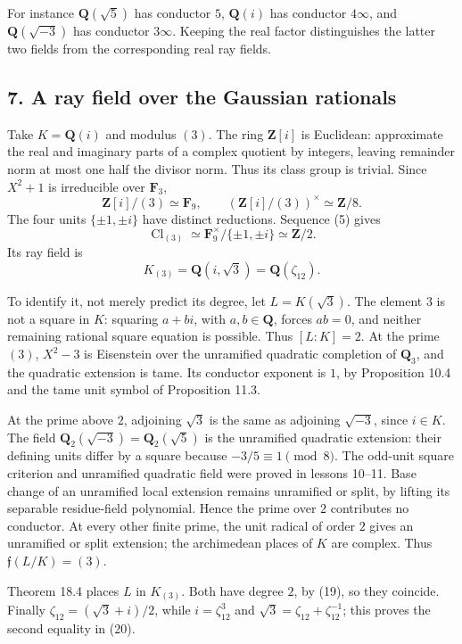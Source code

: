 \documentclass[11pt,a4paper]{article}
\begin{document}
For instance \(\mathbf Q(\sqrt5)\) has conductor \(5\), \(\mathbf Q(i)\)
has conductor \(4\infty\), and \(\mathbf Q(\sqrt{-3})\) has conductor
\(3\infty\). Keeping the real factor distinguishes the latter two fields
from the corresponding real ray fields.

\subsection{7. A ray field over the Gaussian
rationals}\label{a-ray-field-over-the-gaussian-rationals}

Take \(K=\mathbf Q(i)\) and modulus \((3)\). The ring \(\mathbf Z[i]\)
is Euclidean: approximate the real and imaginary parts of a complex
quotient by integers, leaving remainder norm at most one half the
divisor norm. Thus its class group is trivial. Since \(X^2+1\) is
irreducible over \(\mathbf F_3\), \[
\mathbf Z[i]/(3)\simeq\mathbf F_9,
\qquad (\mathbf Z[i]/(3))^\times\simeq\mathbf Z/8.
\] The four units \(\{\pm1,\pm i\}\) have distinct reductions. Sequence
(5) gives \[
\operatorname{Cl}_{(3)}\simeq
\mathbf F_9^\times/\{\pm1,\pm i\}\simeq\mathbf Z/2.
\tag{19}
\] Its ray field is \[
K_{(3)}=\mathbf Q(i,\sqrt3)=\mathbf Q(\zeta_{12}).
\tag{20}
\]

To identify it, not merely predict its degree, let \(L=K(\sqrt3)\). The
element \(3\) is not a square in \(K\): squaring \(a+bi\), with
\(a,b\in\mathbf Q\), forces \(ab=0\), and neither remaining rational
square equation is possible. Thus \([L:K]=2\). At the prime \((3)\),
\(X^2-3\) is Eisenstein over the unramified quadratic completion of
\(\mathbf Q_3\), and the quadratic extension is tame. Its conductor
exponent is \(1\), by Proposition 10.4 and the tame unit symbol of
Proposition 11.3.

At the prime above \(2\), adjoining \(\sqrt3\) is the same as adjoining
\(\sqrt{-3}\), since \(i\in K\). The field
\(\mathbf Q_2(\sqrt{-3})=\mathbf Q_2(\sqrt5)\) is the unramified
quadratic extension: their defining units differ by a square because
\(-3/5\equiv1\pmod8\). The odd-unit square criterion and unramified
quadratic field were proved in lessons 10--11. Base change of an
unramified local extension remains unramified or split, by lifting its
separable residue-field polynomial. Hence the prime over \(2\)
contributes no conductor. At every other finite prime, the unit radical
of order \(2\) gives an unramified or split extension; the archimedean
places of \(K\) are complex. Thus \(\mathfrak f(L/K)=(3)\).

Theorem 18.4 places \(L\) in \(K_{(3)}\). Both have degree \(2\), by
(19), so they coincide. Finally \(\zeta_{12}=(\sqrt3+i)/2\), while
\(i=\zeta_{12}^3\) and \(\sqrt3=\zeta_{12}+\zeta_{12}^{-1}\); this
proves the second equality in (20).
\end{document}

